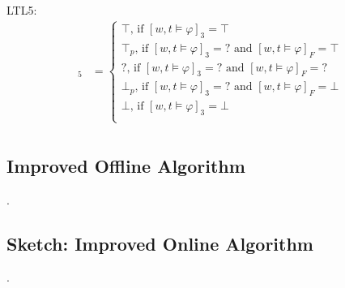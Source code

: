 \documentclass[envcountsame, runningheads]{llncs}
\newcommand{\?}{\text{?}}
\begin{document}
	LTL5:
	\begin{align*}
		[w,t \models \varphi]_5 &= \begin{cases}
			\top \text{, if } [w,t \models \varphi]_3 = \top \\
			\top_p \text{, if } [w,t \models \varphi]_3 = ? \text{ and } [w,t \models \varphi]_F = \top \\
			? \text{, if } [w,t \models \varphi]_3 = ? \text{ and } [w,t \models \varphi]_F = ? \\
			\bot_p \text{, if } [w,t \models \varphi]_3 = ? \text{ and } [w,t \models \varphi]_F = \bot \\
			\bot \text{, if } [w,t \models \varphi]_3 = \bot \\
		\end{cases} \\
	\end{align*}
	
	
	\subsection*{Improved Offline Algorithm}
	.
	
	\subsection*{Sketch: Improved Online Algorithm}
	.
	
	
	\newpage
	
	
\end{document}
